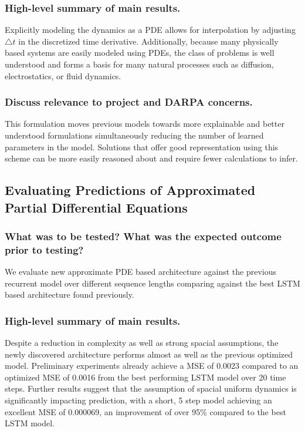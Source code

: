 \documentclass[12pt]{article}
\theoremstyle{plain}
\theoremstyle{remark}
\theoremstyle{definition}
\begin{document}
    \subsubsection{High-level summary of main results.}
    Explicitly modeling the dynamics as a PDE allows for interpolation by adjusting $\bigtriangleup t$ in the discretized time derivative. Additionally, because many physically based systems are easily modeled using PDEs, the class of problems is well understood and forms a basis for many natural processes such as diffusion, electrostatics, or fluid dynamics.

    \subsubsection{Discuss relevance to project and DARPA concerns.}
    This formulation moves previous models towards more explainable and better understood formulations simultaneously reducing the number of learned parameters in the model. Solutions that offer good representation using this scheme can be more easily reasoned about and require fewer calculations to infer.

    \subsection{Evaluating Predictions of Approximated Partial Differential Equations}

    \subsubsection{What was to be tested? What was the expected outcome prior to testing?}
    We evaluate new approximate PDE based architecture against the previous recurrent model over different sequence lengths comparing against the best LSTM based architecture found previously.


    \subsubsection{High-level summary of main results.}
    Despite a reduction in complexity as well as strong spacial assumptions, the newly discovered architecture performs almost as well as the previous optimized model. Preliminary experiments already achieve a MSE of 0.0023 compared to an optimized MSE of 0.0016 from the best performing LSTM model over 20 time steps. Further results suggest that the assumption of spacial uniform dynamics is significantly impacting prediction, with a short, 5 step model achieving an excellent MSE of 0.000069, an improvement of over 95\% compared to the best LSTM model.
\end{document}
